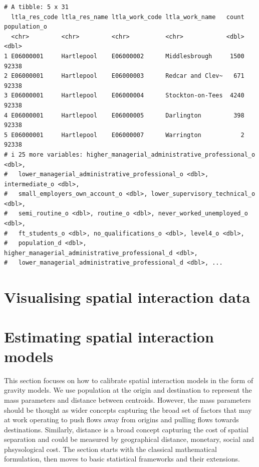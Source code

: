 \documentclass[
  a4paper, 
  twoside,
  final
]{article}
\newcounter{code}
\begin{document}
\begin{verbatim}
# A tibble: 5 x 31
  ltla_res_code ltla_res_name ltla_work_code ltla_work_name   count population_o
  <chr>         <chr>         <chr>          <chr>            <dbl>        <dbl>
1 E06000001     Hartlepool    E06000002      Middlesbrough     1500        92338
2 E06000001     Hartlepool    E06000003      Redcar and Clev~   671        92338
3 E06000001     Hartlepool    E06000004      Stockton-on-Tees  4240        92338
4 E06000001     Hartlepool    E06000005      Darlington         398        92338
5 E06000001     Hartlepool    E06000007      Warrington           2        92338
# i 25 more variables: higher_managerial_administrative_professional_o <dbl>,
#   lower_managerial_administrative_professional_o <dbl>, intermediate_o <dbl>,
#   small_employers_own_account_o <dbl>, lower_supervisory_technical_o <dbl>,
#   semi_routine_o <dbl>, routine_o <dbl>, never_worked_unemployed_o <dbl>,
#   ft_students_o <dbl>, no_qualifications_o <dbl>, level4_o <dbl>,
#   population_d <dbl>, higher_managerial_administrative_professional_d <dbl>,
#   lower_managerial_administrative_professional_d <dbl>, ...
\end{verbatim}

\hypertarget{sec-visualising}{%
\section{Visualising spatial interaction data}\label{sec-visualising}}

\hypertarget{sec-modelling}{%
\section{Estimating spatial interaction models}\label{sec-modelling}}

This section focuses on how to calibrate spatial interaction models in
the form of gravity models. We use population at the origin and
destination to represent the mass parameters and distance between
centroids. However, the mass parameters should be thought as wider
concepts capturing the broad set of factors that may at work operating
to push flows away from origins and pulling flows towards destinations.
Similarly, distance is a broad concept capturing the cost of spatial
separation and could be measured by geographical distance, monetary,
social and phsysological cost. The section starts with the classical
mathematical formulation, then moves to basic statistical frameworks and
their extensions.
\end{document}
